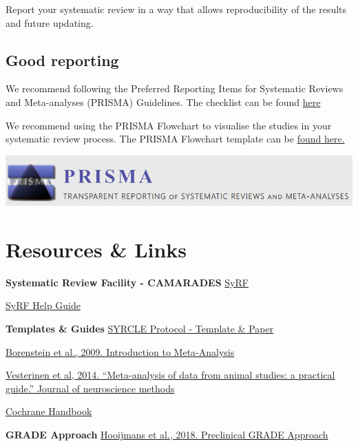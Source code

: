 \documentclass[
]{book}
\begin{document}
Report your systematic review in a way that allows reproducibility of the results and future updating.

\hypertarget{good-reporting}{%
\section{Good reporting}\label{good-reporting}}

We recommend following the Preferred Reporting Items for Systematic Reviews and Meta-analyses (PRISMA) Guidelines. The checklist can be found \href{http://www.prisma-statement.org/PRISMAStatement/Checklist}{here}

We recommend using the PRISMA Flowchart to visualise the studies in your systematic review process. The PRISMA Flowchart template can be \href{http://prisma-statement.org/prismastatement/flowdiagram}{found here.}

\includegraphics{figs/PRISMA.png}

\hypertarget{resources-links}{%
\chapter{Resources \& Links}\label{resources-links}}

\textbf{Systematic Review Facility - CAMARADES}
\href{https://syrf.org.uk/}{SyRF}

\href{https://help.syrf.org.uk/}{SyRF Help Guide}

\textbf{Templates \& Guides}
\href{https://onlinelibrary.wiley.com/doi/epdf/10.1002/ebm2.7}{SYRCLE Protocol - Template \& Paper}

\href{https://onlinelibrary.wiley.com/doi/book/10.1002/9780470743386}{Borenstein et al., 2009. Introduction to Meta-Analysis}

\href{https://doi.org/10.1016/j.jneumeth.2013.09.010}{Vesterinen et al, 2014. ``Meta-analysis of data from animal studies: a practical guide.'' Journal of neuroscience methods}

\href{https://training.cochrane.org/handbook/current}{Cochrane Handbook}

\textbf{GRADE Approach}
\href{https://journals.plos.org/plosone/article?id=10.1371/journal.pone.0187271}{Hooijmans et al., 2018. Preclinical GRADE Approach}
\end{document}
